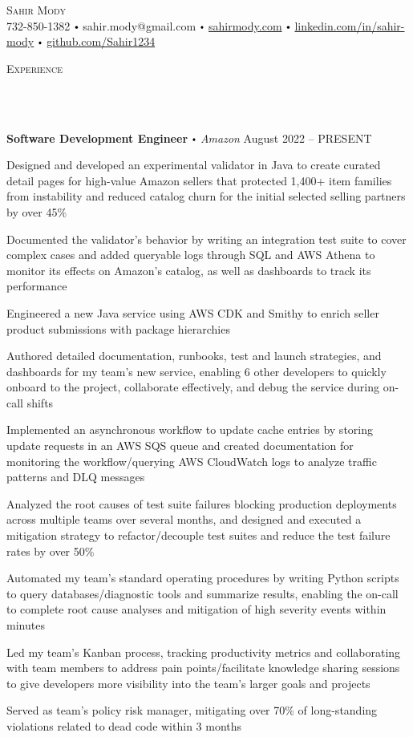 \documentclass{article}
\newcommand{\contact}[3]{
\vspace*{3pt}
\begin{center}
{\Huge \scshape {#1}}\\
\vspace{0pt}
#2 
\vspace{0pt}
#3
\end{center}
\vspace*{-3pt}
}
\newcommand{\header}[1]{{
\hspace*{-15pt}\vspace*{10pt} \large \scshape{#1}} \vspace*{-6pt} 
\lineunder
}
\newcommand{\lineunder}{
\vspace*{-8pt} \\ \hspace*{-18pt} 
\hrulefill \\
}
\newcommand{\employer}[4]{
\textbf{#1} \labelitemi \textit{#2} \hfill #3 \\ #4 \vspace*{3pt}
}
\renewcommand{\labelitemi}{
$\vcenter{\hbox{\tiny$\bullet$}}$\hspace*{3pt}
}
\renewcommand{\labelitemii}{
$\vcenter{\hbox{\tiny$\bullet$}}$\hspace*{-3pt}
}
\newenvironment{bullet-list-minor}{
\begin{list}{\labelitemii}{\setlength\leftmargin{15pt} 
\topsep 0pt \itemsep 1pt}}{\vspace*{4pt}\end{list}
}
\begin{document}
\small
\vspace*{-64pt}

\contact{Sahir Mody}\bigskip
{{732-850-1382}\labelitemi{sahir.mody@gmail.com}\labelitemi\href{https://sahirmody.com}{sahirmody.com}\labelitemi\href{https://www.linkedin.com/in/sahir-mody}{linkedin.com/in/sahir-mody}  \labelitemi\href{https://www.github.com/Sahir1234}{github.com/Sahir1234}}
\medskip
\header{Experience}
    \vspace{4pt}
    \employer{Software Development Engineer}{Amazon}{August 2022 -- PRESENT}{}
	\begin{bullet-list-minor}
        \item Designed and developed an experimental validator in Java to create curated detail pages for high-value Amazon sellers that protected 1,400+ item families from instability and reduced catalog churn for the initial selected selling partners by over 45\%
        \item Documented the validator's behavior by writing an integration test suite to cover complex cases and added queryable logs through SQL and AWS Athena to monitor its effects on Amazon's catalog, as well as dashboards to track its performance
        \item Engineered a new Java service using AWS CDK and Smithy to enrich seller product submissions with package hierarchies
        \item Authored detailed documentation, runbooks, test and launch strategies, and dashboards for my team's new service, enabling 6 other developers to quickly onboard to the project, collaborate effectively, and debug the service during on-call shifts
        \item Implemented an asynchronous workflow to update cache entries by storing update requests in an AWS SQS queue and created documentation for monitoring the workflow/querying AWS CloudWatch logs to analyze traffic patterns and DLQ messages
        \item Analyzed the root causes of test suite failures blocking production deployments across multiple teams over several months, and designed and executed a mitigation strategy to refactor/decouple test suites and reduce the test failure rates by over 50\%
        \item Automated my team's standard operating procedures by writing Python scripts to query databases/diagnostic tools and summarize results, enabling the on-call to complete root cause analyses and mitigation of high severity events within minutes
        \item Led my team's Kanban process, tracking productivity metrics and collaborating with team members to address pain points/facilitate knowledge sharing sessions to give developers more visibility into the team's larger goals and projects
        \item Served as team's policy risk manager, mitigating over 70\% of long-standing violations related to dead code within 3 months
    \end{bullet-list-minor}
    \medskip
    
\end{document}
